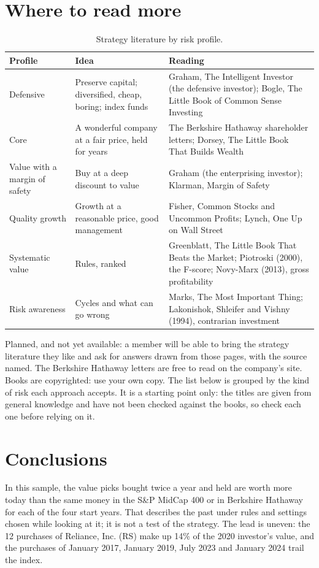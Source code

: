 \documentclass[11pt,a4paper]{article}
\begin{document}
\section{Where to read more}
\label{sec:reading}
\begin{table}[H]
\centering
\small
\caption{Strategy literature by risk profile.}\label{tab:reading}
\begin{tabular}{l p{4.5cm} p{5.6cm}}
\hline
Profile & Idea & Reading \\
\hline
Defensive & Preserve capital; diversified, cheap, boring; index funds & Graham, The Intelligent Investor (the defensive investor); Bogle, The Little Book of Common Sense Investing \\
Core & A wonderful company at a fair price, held for years & The Berkshire Hathaway shareholder letters; Dorsey, The Little Book That Builds Wealth \\
Value with a margin of safety & Buy at a deep discount to value & Graham (the enterprising investor); Klarman, Margin of Safety \\
Quality growth & Growth at a reasonable price, good management & Fisher, Common Stocks and Uncommon Profits; Lynch, One Up on Wall Street \\
Systematic value & Rules, ranked & Greenblatt, The Little Book That Beats the Market; Piotroski (2000), the F-score; Novy-Marx (2013), gross profitability \\
Risk awareness & Cycles and what can go wrong & Marks, The Most Important Thing; Lakonishok, Shleifer and Vishny (1994), contrarian investment \\
\hline
\end{tabular}
\end{table}
Planned, and not yet available: a member will be able to bring the strategy literature they like and ask for answers drawn from those pages, with the source named. The Berkshire Hathaway letters are free to read on the company's site. Books are copyrighted: use your own copy. The list below is grouped by the kind of risk each approach accepts. It is a starting point only: the titles are given from general knowledge and have not been checked against the books, so check each one before relying on it.

\section{Conclusions}
In this sample, the value picks bought twice a year and held are worth more today than the same money in the S\&P MidCap 400 or in Berkshire Hathaway for each of the four start years. That describes the past under rules and settings chosen while looking at it; it is not a test of the strategy. The lead is uneven: the 12 purchases of Reliance, Inc. (RS) make up 14\% of the 2020 investor's value, and the purchases of January 2017, January 2019, July 2023 and January 2024 trail the index.
\end{document}
